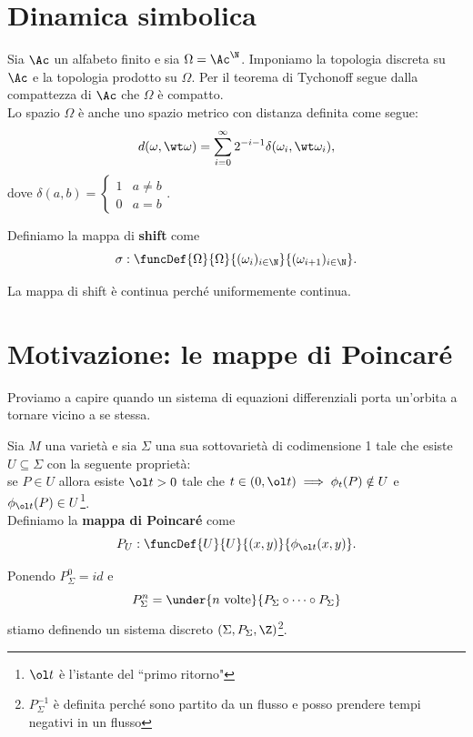 \section{Dinamica simbolica}
Sia $\Ac$ un alfabeto finito e sia $\Omega=\Ac^\N$. Imponiamo la topologia discreta su $\Ac$ e la topologia prodotto su $\Omega$. Per il teorema di Tychonoff segue dalla compattezza di $\Ac$ che $\Omega$ \`e compatto.\\
Lo spazio $\Omega$ \`e anche uno spazio metrico con distanza definita come segue:
\[d(\omega,\wt \omega)=\sum_{i=0}^\infty 2^{-i-1}\delta(\omega_i,\wt \omega_i),\]
dove $\delta(a,b)=\begin{cases}
1 & a\neq b\\
0 & a=b
\end{cases}$.

\begin{definition}[Shift]
Definiamo la mappa di \textbf{shift} come
\[\sigma:\funcDef{\Omega}{\Omega}{(\omega_i)_{i\in\N}}{(\omega_{i+1})_{i\in\N}}.\]
\end{definition}
\begin{remark}
La mappa di shift \`e continua perch\'e uniformemente continua.
\end{remark}


\section{Motivazione: le mappe di Poincar\'e}
Proviamo a capire quando un sistema di equazioni differenziali porta un'orbita a tornare vicino a se stessa.

\begin{definition}
Sia $M$ una variet\`a e sia $\Sigma$ una sua sottovariet\`a di codimensione 1 tale che esiste $U\subseteq \Sigma$ con la seguente propriet\`a:\\
se $P\in U$ allora esiste $\ol t>0$ tale che $t\in (0,\ol t)\implies \phi_t(P)\notin U$ e $\phi_{\ol t}(P)\in U$\footnote{$\ol t$ \`e l'istante del ``primo ritorno"}.\\
Definiamo la \textbf{mappa di Poincar\'e} come
\[P_U:\funcDef{U}{U}{(x,y)}{\phi_{\ol t}(x,y)}.\]
\end{definition}
\begin{remark}
Ponendo $P_\Sigma^0=id$ e
\[P_\Sigma^n=\under{n\text{ volte}}{P_\Sigma\circ\cdots\circ P_\Sigma}\]
stiamo definendo un sistema discreto $(\Sigma,P_\Sigma,\Z)$\footnote{$P_\Sigma^{-1}$ \`e definita perch\'e sono partito da un flusso e posso prendere tempi negativi in un flusso}.
\end{remark}

